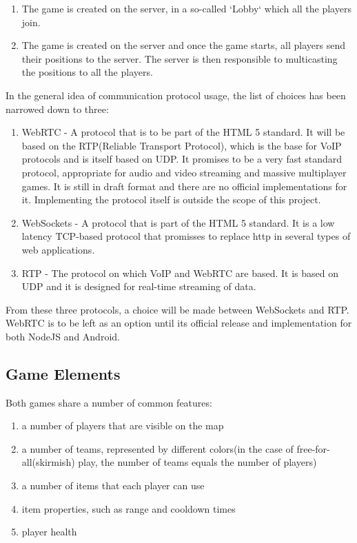\documentclass{article}
\begin{document}
\begin{enumerate}
	\item The game is created on the server, in a so-called `Lobby` which all the
	players join.
	\item The game is created on the server and once the game starts, all players send
their positions to the server. The server is then responsible to multicasting
the positions to all the players. 
\end{enumerate}

In the general idea of communication protocol usage, the list of choices has
been narrowed down to three:

\begin{enumerate}
	\item WebRTC - A protocol that is to be part of the HTML 5 standard. It will be
	based on the RTP(Reliable Transport Protocol), which is the base for VoIP
	protocols and is itself based on UDP. It promises to be a very fast standard
	protocol, appropriate for audio and video streaming and massive multiplayer
	games. It is still in draft format and there are no official implementations
	for it. Implementing the protocol itself is outside the scope of this project.
	\item WebSockets - A protocol that is part of the HTML 5 standard. It is a low
	latency TCP-based protocol that promisses to replace http in several types of
	web applications.
	\item RTP - The protocol on which VoIP and WebRTC are based. It is based on UDP
	and it is designed for real-time streaming of data.
\end{enumerate}

From these three protocols, a choice will be made between WebSockets and RTP.
WebRTC is to be left as an option until its official release and implementation
for both NodeJS and Android.

\subsection{Game Elements}

Both games share a number of common features:
\begin{enumerate}
  \item a number of players that are visible on the map
  \item a number of teams, represented by different colors(in the case of
  free-for-all(skirmish) play, the number of teams equals the number of players)  
  \item a number of items that each player can use
  \item item properties, such as range and cooldown times
  \item player health
\end{enumerate} 
\end{document}
